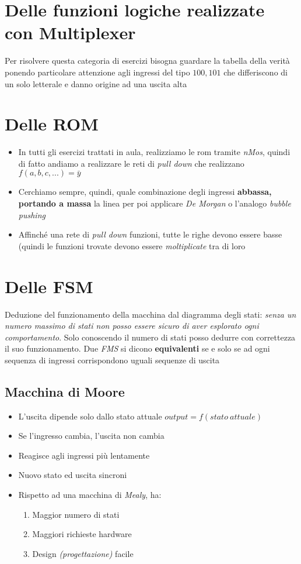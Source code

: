 \documentclass{article}
\begin{document}
\section{Delle funzioni logiche realizzate con Multiplexer}
Per risolvere questa categoria di esercizi bisogna guardare la tabella della verità ponendo particolare attenzione agli ingressi del tipo \(100, 101\) che differiscono di un solo letterale e danno origine ad una uscita alta 

\section{Delle ROM}
\begin{itemize}
	\item In tutti gli esercizi trattati in aula, realizziamo le rom tramite \textit{nMos}, quindi di fatto andiamo a realizzare le reti di \textit{pull down} che realizzano \(f (a, b, c, ... ) = \bar{y} \)
	\item Cerchiamo sempre, quindi, quale combinazione degli ingressi \textbf{abbassa, portando a massa} la linea per poi applicare \textit{De Morgan} o l'analogo \textit{bubble pushing}
	\item Affinché una rete di \textit{pull down} funzioni, tutte le righe devono essere basse (quindi le funzioni trovate devono essere \textit{moltiplicate} tra di loro
\end{itemize}

\section{Delle FSM}
Deduzione del funzionamento della macchina dal diagramma degli stati: \textit{senza un numero massimo di stati non posso essere sicuro di aver esplorato ogni comportamento}. Solo conoscendo il numero di stati posso dedurre con correttezza il suo funzionamento.
Due \textit{FMS} si dicono \textbf{equivalenti} se e solo se ad ogni sequenza di ingressi corrispondono uguali sequenze di uscita
\subsection{Macchina di Moore}
\begin{itemize}
	\item L'uscita dipende solo dallo stato attuale \(output=f(stato\:attuale)\)
	\item Se l'ingresso cambia, l'uscita non cambia
	\item Reagisce agli ingressi più lentamente
	\item Nuovo stato ed uscita sincroni
	\item Rispetto ad una macchina di \textit{Mealy}, ha:
	\begin{enumerate}
		\item Maggior numero di stati
		\item Maggiori richieste hardware
		\item Design \textit{(progettazione)} facile
	\end{enumerate}
\end{itemize}
\end{document}
